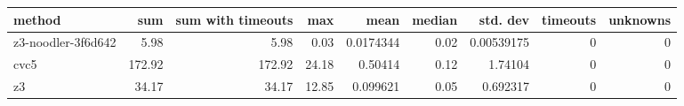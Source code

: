 \begin{tabular}{lrrrrrrrr}
\hline
 method             &    sum &   sum with timeouts &   max &      mean &   median &   std. dev &   timeouts &   unknowns \\
\hline
 z3-noodler-3f6d642 &   5.98 &                5.98 &  0.03 & 0.0174344 &     0.02 & 0.00539175 &          0 &          0 \\
 cvc5               & 172.92 &              172.92 & 24.18 & 0.50414   &     0.12 & 1.74104    &          0 &          0 \\
 z3                 &  34.17 &               34.17 & 12.85 & 0.099621  &     0.05 & 0.692317   &          0 &          0 \\
\hline
\end{tabular}
